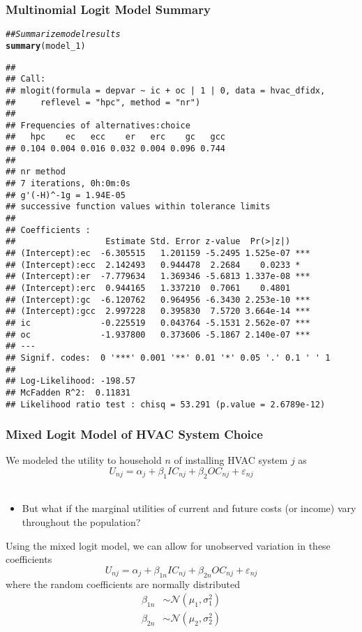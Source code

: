 \documentclass{beamer}\usepackage[]{graphicx}\usepackage[]{color}
\makeatletter
\newcommand{\hlcom}[1]{\textcolor[rgb]{0.678,0.584,0.686}{\textit{#1}}}%
\newcommand{\hlstd}[1]{\textcolor[rgb]{0.345,0.345,0.345}{#1}}%
\newcommand{\hlkwd}[1]{\textcolor[rgb]{0.737,0.353,0.396}{\textbf{#1}}}%
\newenvironment{kframe}{%
 \def\at@end@of@kframe{}%
 \ifinner\ifhmode%
  \def\at@end@of@kframe{\end{minipage}}%
  \begin{minipage}{\columnwidth}%
 \fi\fi%
 \def\FrameCommand##1{\hskip\@totalleftmargin \hskip-\fboxsep
 \colorbox{shadecolor}{##1}\hskip-\fboxsep
     \hskip-\linewidth \hskip-\@totalleftmargin \hskip\columnwidth}%
 \MakeFramed {\advance\hsize-\width
   \@totalleftmargin\z@ \linewidth\hsize
   \@setminipage}}%
 {\par\unskip\endMakeFramed%
 \at@end@of@kframe}
\newenvironment{knitrout}{}{} %
\makeatother
\begin{document}
\begin{frame}[fragile]\frametitle{Multinomial Logit Model Summary}
\begin{knitrout}\tiny
{}\color{fgcolor}\begin{kframe}
\begin{alltt}
\hlcom{## Summarize model results}
\hlkwd{summary}\hlstd{(model_1)}
\end{alltt}
\begin{verbatim}
## 
## Call:
## mlogit(formula = depvar ~ ic + oc | 1 | 0, data = hvac_dfidx, 
##     reflevel = "hpc", method = "nr")
## 
## Frequencies of alternatives:choice
##   hpc    ec   ecc    er   erc    gc   gcc 
## 0.104 0.004 0.016 0.032 0.004 0.096 0.744 
## 
## nr method
## 7 iterations, 0h:0m:0s 
## g'(-H)^-1g = 1.94E-05 
## successive function values within tolerance limits 
## 
## Coefficients :
##                  Estimate Std. Error z-value  Pr(>|z|)    
## (Intercept):ec  -6.305515   1.201159 -5.2495 1.525e-07 ***
## (Intercept):ecc  2.142493   0.944478  2.2684    0.0233 *  
## (Intercept):er  -7.779634   1.369346 -5.6813 1.337e-08 ***
## (Intercept):erc  0.944165   1.337210  0.7061    0.4801    
## (Intercept):gc  -6.120762   0.964956 -6.3430 2.253e-10 ***
## (Intercept):gcc  2.997228   0.395830  7.5720 3.664e-14 ***
## ic              -0.225519   0.043764 -5.1531 2.562e-07 ***
## oc              -1.937800   0.373606 -5.1867 2.140e-07 ***
## ---
## Signif. codes:  0 '***' 0.001 '**' 0.01 '*' 0.05 '.' 0.1 ' ' 1
## 
## Log-Likelihood: -198.57
## McFadden R^2:  0.11831 
## Likelihood ratio test : chisq = 53.291 (p.value = 2.6789e-12)
\end{verbatim}
\end{kframe}
\end{knitrout}
\end{frame}

\begin{frame}\frametitle{Mixed Logit Model of HVAC System Choice}
    We modeled the utility to household $n$ of installing HVAC system $j$ as
    $$U_{nj} = \alpha_j + \beta_1 IC_{nj} + \beta_2 OC_{nj} + \varepsilon_{nj}$$ \\
    \begin{itemize}
    	\item But what if the marginal utilities of current and future costs (or income) vary throughout the population?
    \end{itemize}
	\vspace{3ex}
	Using the mixed logit model, we can allow for unobserved variation in these coefficients
	$$U_{nj} = \alpha_j + \beta_{1n} IC_{nj} + \beta_{2n} OC_{nj} + \varepsilon_{nj}$$
	where the random coefficients are normally distributed
	\begin{align*}
		\beta_{1n} & \sim \mathcal{N}(\mu_1, \sigma_1^2) \\
		\beta_{2n} & \sim \mathcal{N}(\mu_2, \sigma_2^2)
	\end{align*}
\end{frame}
\end{document}
